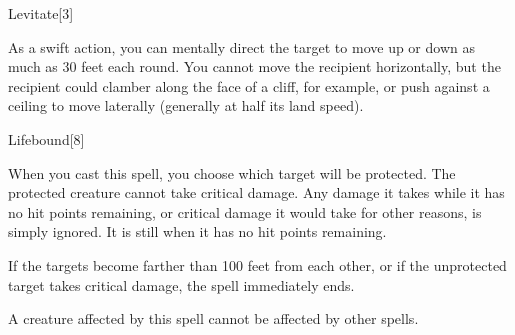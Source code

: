 \begin{spellsection}{Levitate}[3]
    \begin{spellheader}
    \end{spellheader}
    \begin{spellcontent}
        \begin{spelltargetinginfo}
            \spellrng{\rngclose}
        \end{spelltargetinginfo}
        \begin{spelleffects}
            \spelleffect As a swift action, you can mentally direct the target to move up or down as much as 30 feet each round. You cannot move the recipient horizontally, but the recipient could clamber along the face of a cliff, for example, or push against a ceiling to move laterally (generally at half its land speed).
            \spelldur \durshort \dismissable
        \end{spelleffects}
    \end{spellcontent}
    \begin{spellfooter}
        \miscastrandom
    \end{spellfooter}
\end{spellsection}

\begin{spellsection}{Lifebound}[8]
    \begin{spellheader}
    \end{spellheader}
    \begin{spellcontent}
        \begin{spelltargetinginfo}
        \end{spelltargetinginfo}
        \begin{spelleffects}
            \spellspecial When you cast this spell, you choose which target will be protected.
            \spelleffect The protected creature cannot take critical damage. Any damage it takes while it has no hit points remaining, or critical damage it would take for other reasons, is simply ignored. It is still \disabled when it has no hit points remaining.

            If the targets become farther than 100 feet from each other, or if the unprotected target takes critical damage, the spell immediately ends.
            \spelldur \durshort
        \end{spelleffects}
    \end{spellcontent}
    \begin{spellfooter}
        \spellnotes A creature affected by this spell cannot be affected by other  spells.
        \miscastexplode
    \end{spellfooter}
\end{spellsection}

